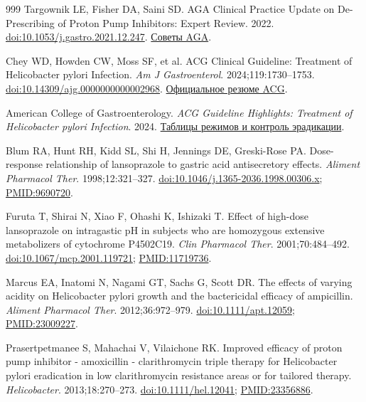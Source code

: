 \documentclass[11pt,a4paper,notitlepage]{report}
\begin{document}
\begin{thebibliography}{999}
 Targownik LE, Fisher DA, Saini SD. AGA Clinical Practice Update on De-Prescribing of Proton Pump Inhibitors: Expert Review. 2022. \href{https://doi.org/10.1053/j.gastro.2021.12.247}{doi:10.1053/j.gastro.2021.12.247}. \href{https://gastro.org/clinical-guidance/de-prescribing-proton-pump-inhibitors-ppis/}{Советы AGA}.

 Chey WD, Howden CW, Moss SF, et al. ACG Clinical Guideline: Treatment of Helicobacter pylori Infection. \textit{Am J Gastroenterol}. 2024;119:1730--1753. \href{https://doi.org/10.14309/ajg.0000000000002968}{doi:10.14309/ajg.0000000000002968}. \href{https://gi.org/journals-publications/ebgi/schoenfeld_sep2024/}{Официальное резюме ACG}.

 American College of Gastroenterology. \textit{ACG Guideline Highlights: Treatment of Helicobacter pylori Infection}. 2024. \href{https://gi.org/wp-content/uploads/2025/01/ACG-Hpylori-Guidelines-Highlights-2024-FINAL.pdf.pdf}{Таблицы режимов и контроль эрадикации}.

 Blum RA, Hunt RH, Kidd SL, Shi H, Jennings DE, Greski-Rose PA. Dose-response relationship of lansoprazole to gastric acid antisecretory effects. \textit{Aliment Pharmacol Ther}. 1998;12:321--327. \href{https://doi.org/10.1046/j.1365-2036.1998.00306.x}{doi:10.1046/j.1365-2036.1998.00306.x}; \href{https://pubmed.ncbi.nlm.nih.gov/9690720/}{PMID:9690720}.

 Furuta T, Shirai N, Xiao F, Ohashi K, Ishizaki T. Effect of high-dose lansoprazole on intragastic pH in subjects who are homozygous extensive metabolizers of cytochrome P4502C19. \textit{Clin Pharmacol Ther}. 2001;70:484--492. \href{https://doi.org/10.1067/mcp.2001.119721}{doi:10.1067/mcp.2001.119721}; \href{https://pubmed.ncbi.nlm.nih.gov/11719736/}{PMID:11719736}.

 Marcus EA, Inatomi N, Nagami GT, Sachs G, Scott DR. The effects of varying acidity on Helicobacter pylori growth and the bactericidal efficacy of ampicillin. \textit{Aliment Pharmacol Ther}. 2012;36:972--979. \href{https://doi.org/10.1111/apt.12059}{doi:10.1111/apt.12059}; \href{https://pubmed.ncbi.nlm.nih.gov/23009227/}{PMID:23009227}.

 Prasertpetmanee S, Mahachai V, Vilaichone RK. Improved efficacy of proton pump inhibitor - amoxicillin - clarithromycin triple therapy for Helicobacter pylori eradication in low clarithromycin resistance areas or for tailored therapy. \textit{Helicobacter}. 2013;18:270--273. \href{https://doi.org/10.1111/hel.12041}{doi:10.1111/hel.12041}; \href{https://pubmed.ncbi.nlm.nih.gov/23356886/}{PMID:23356886}.


\end{thebibliography}
\end{document}
